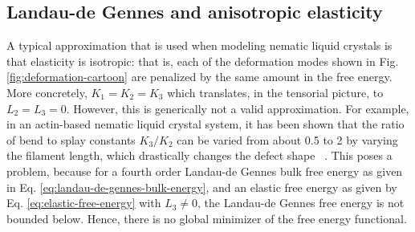 \documentclass[reqno]{article}
\begin{document}
  \subsection{Landau-de Gennes and anisotropic elasticity} \label{anisotropic-elasticity}
  A typical approximation that is used when modeling nematic liquid crystals is
  that elasticity is isotropic: that is, each of the deformation modes shown in
  Fig. \ref{fig:deformation-cartoon} are penalized by the same amount in the
  free energy.
  More concretely, $K_1 = K_2 = K_3$ which translates, in the tensorial
  picture, to $L_2 = L_3 = 0$.
  However, this is generically not a valid approximation.
  For example, in an actin-based nematic liquid crystal system, it has been shown that the
  ratio of bend to splay constants $K_3 / K_2$ can be varied from about 0.5 to 2
  by varying the filament length, which drastically changes the defect shape
  ~\cite{zhang_interplay_2018-1}.
  This poses a problem, because for a fourth order Landau-de Gennes bulk free
  energy as given in Eq. \eqref{eq:landau-de-gennes-bulk-energy}, and an elastic free
  energy as given by Eq. \eqref{eq:elastic-free-energy} with $L_3 \neq 0$, the
  Landau-de Gennes free energy is not bounded below.
  Hence, there is no global minimizer of the free energy functional.
\end{document}
